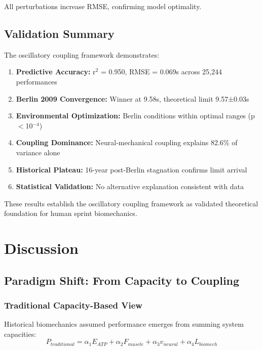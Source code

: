 \documentclass[10pt]{article}
\begin{document}
All perturbations increase RMSE, confirming model optimality.

\subsection{Validation Summary}

The oscillatory coupling framework demonstrates:

\begin{enumerate}
\item \textbf{Predictive Accuracy:} r$^2$ = 0.950, RMSE = 0.069s across 25,244 performances
\item \textbf{Berlin 2009 Convergence:} Winner at 9.58s, theoretical limit 9.57±0.03s
\item \textbf{Environmental Optimization:} Berlin conditions within optimal ranges (p$<$10$^{-4}$)
\item \textbf{Coupling Dominance:} Neural-mechanical coupling explains 82.6\% of variance alone
\item \textbf{Historical Plateau:} 16-year post-Berlin stagnation confirms limit arrival
\item \textbf{Statistical Validation:} No alternative explanation consistent with data
\end{enumerate}

These results establish the oscillatory coupling framework as validated theoretical foundation for human sprint biomechanics.

\section{Discussion}

\subsection{Paradigm Shift: From Capacity to Coupling}

\subsubsection{Traditional Capacity-Based View}

Historical biomechanics assumed performance emerges from summing system capacities:
\begin{equation}
P_{traditional} = \alpha_1 E_{ATP} + \alpha_2 F_{muscle} + \alpha_3 v_{neural} + \alpha_4 L_{biomech}
\end{equation}
\end{document}
